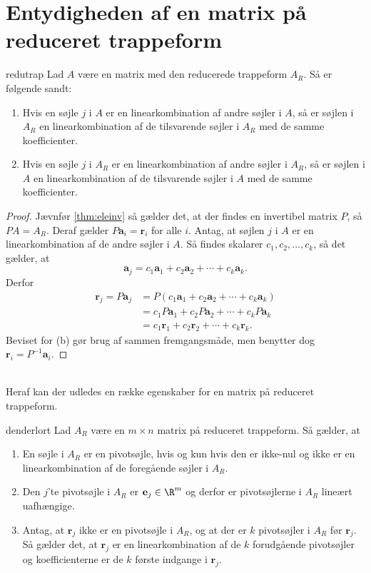 \chapter{Entydigheden af en matrix på reduceret trappeform}

\begin{thm}{}{redutrap}
Lad $A$ være en matrix med den reducerede trappeform $A_R$.
Så er følgende sandt:
\begin{enumerate}[label=(\alph*)]
\item  Hvis en søjle $j$ i $A$ er en linearkombination  af andre søjler i $A$, så er søjlen i $A_R$ en linearkombination af de tilsvarende søjler i $A_R$ med de samme koefficienter.
\item  Hvis en søjle $j$ i $A_R$ er en linearkombination  af andre søjler i $A_R$, så er søjlen i $A$ en linearkombination af de tilsvarende søjler i $A$ med de samme koefficienter.
\end{enumerate}
\end{thm}%
\begin{proof}
Jævnfør \ref{thm:eleinv} så gælder det, at der findes en invertibel matrix $P$, så $PA=A_R$.
Deraf gælder $P\textbf{a}_i=\textbf{r}_i$ for alle $i$.
Antag, at søjlen $j$ i $A$ er en linearkombination af de andre søjler i $A$.
Så findes skalarer $c_1,c_2,\ldots,c_k$, så det gælder, at \\
\begin{equation}
\textbf{a}_j=c_1\textbf{a}_1+c_2\textbf{a}_2+\cdots+c_k\textbf{a}_k.
\end{equation}
Derfor 
\begin{align*}
\textbf{r}_j=P\textbf{a}_j&=P(c_1\textbf{a}_1+c_2\textbf{a}_2+\cdots+c_k\textbf{a}_k) \\
&= c_1P\textbf{a}_1+c_2P\textbf{a}_2+\cdots+c_kP\textbf{a}_k\\
&= c_1\textbf{r}_1+c_2\textbf{r}_2+\cdots+c_k\textbf{r}_k.
\end{align*}
Beviset for (b) gør brug af sammen fremgangsmåde, men benytter dog $\textbf{r}_i=P^{-1}\textbf{a}_i.$
\end{proof}\\
%
Heraf kan der udledes en række egenskaber for en matrix på reduceret trappeform.
%
\begin{lem}{}{denderlort}
Lad $A_R$ være en $m \times n$ matrix på reduceret trappeform.
Så gælder, at
\begin{enumerate}[label=(\alph*)]
\item En søjle i $A_R$ er en pivotsøjle, hvis og kun hvis den er ikke-nul og ikke er en linearkombination af de foregående søjler i $A_R$. 
\item Den $j$'te pivotsøjle i $A_R$ er $\textbf{e}_j \in \R^m$ og derfor er pivotsøjlerne i $A_R$ lineært uafhængige. 
\item Antag, at $\textbf{r}_j$ ikke er en pivotsøjle i $A_R$, og at der er $k$ pivotsøjler i $A_R$ før $\textbf{r}_j$.
Så gælder det, at $\textbf{r}_j$ er en linearkombination af de $k$ forudgående pivotsøjler og koefficienterne er de $k$ første indgange i $\textbf{r}_j$. 
\end{enumerate}
\end{lem}

